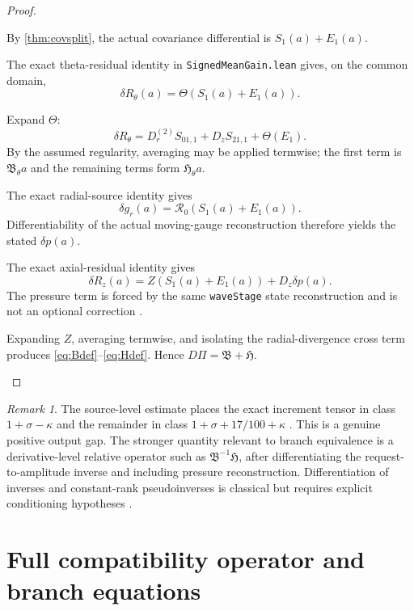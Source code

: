 \documentclass[12pt]{article}
\theoremstyle{plain}
\theoremstyle{definition}
\theoremstyle{remark}
\newtheorem{remark}[theorem]{Remark}
\newcommand{\Red}{\mathfrak B}
\newcommand{\Hidden}{\mathfrak H}
\newcommand{\Obs}{\Pi}
\begin{document}
\begin{proof}
\begin{prooflines}
\item By \cref{thm:covsplit}, the actual covariance differential is \(S_1(a)+E_1(a)\).
\item The exact theta-residual identity in \texttt{SignedMeanGain.lean} gives, on the common domain,
\[
\delta R_\theta(a)=\Theta(S_1(a)+E_1(a)).
\]
\item Expand \(\Theta\):
\[
\delta R_\theta
=D_r^{(2)}S_{01,1}+D_zS_{21,1}+\Theta(E_1).
\]
By the assumed regularity, averaging may be applied termwise; the first term is \(\Red_\theta a\) and the remaining terms form \(\Hidden_\theta a\).
\item The exact radial-source identity gives
\[
\delta g_r(a)=\mathcal R_0(S_1(a)+E_1(a)).
\]
Differentiability of the actual moving-gauge reconstruction therefore yields the stated \(\delta p(a)\).
\item The exact axial-residual identity gives
\[
\delta R_z(a)=Z(S_1(a)+E_1(a))+D_z\delta p(a).
\]
The pressure term is forced by the same \texttt{waveStage} state reconstruction and is not an optional correction \cite{OpenAILeanRepo2026}.
\item Expanding \(Z\), averaging termwise, and isolating the radial-divergence cross term produces \eqref{eq:Bdef}--\eqref{eq:Hdef}. Hence \(D\Obs=\Red+\Hidden\).
\end{prooflines}
\end{proof}

\begin{remark}
The source-level estimate  places the exact increment tensor in class \(1+\sigma-\kappa\) and the remainder in class \(1+\sigma+17/100+\kappa\) \cite{OpenAILeanRepo2026}. This is a genuine positive output gap. The stronger quantity relevant to branch equivalence is a derivative-level relative operator such as \(\Red^{-1}\Hidden\), after differentiating the request-to-amplitude inverse and including pressure reconstruction. Differentiation of inverses and constant-rank pseudoinverses is classical but requires explicit conditioning hypotheses \cite{GolubPereyra1973,StewartSun1990}.
\end{remark}

\section{Full compatibility operator and branch equations}\label{sec:branch-equations}
\end{document}
